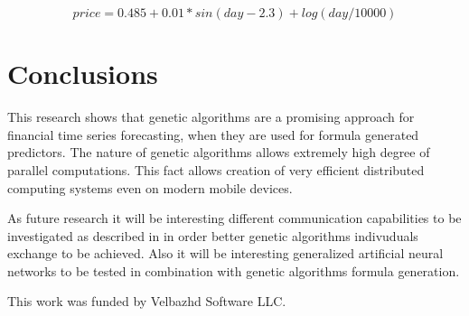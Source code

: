 \documentclass[graybox]{svmult}
\begin{document}
\begin{equation}\label{equ01}
price = 0.485 + 0.01 * sin(day - 2.3) + log(day / 10000)
\end{equation}

\section{Conclusions} \label{Conclusions}

This research shows that genetic algorithms are a promising approach for financial time series forecasting, when they are used for formula generated predictors. The nature of genetic algorithms allows extremely high degree of parallel computations. This fact allows creation of very efficient distributed computing systems even on modern mobile devices. 

As future research it will be interesting different communication capabilities to be investigated as described in \cite{alexandrov01} in order better genetic algorithms indivuduals exchange to be achieved. Also it will be interesting generalized artificial neural networks \cite{tashev01} to be tested in combination with genetic algorithms formula generation.

\begin{acknowledgement}
This work was funded by Velbazhd Software LLC.
\end{acknowledgement}
\end{document}
